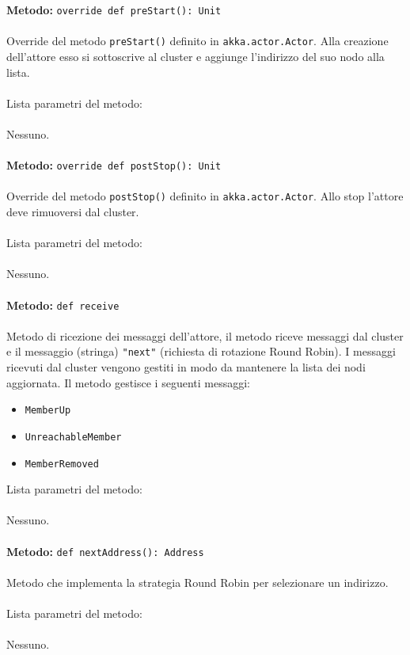 \documentclass[a4paper]{article}
\begin{document}
			\textbf{Metodo: }\texttt{override def preStart(): Unit}
			\\ \\
			Override del metodo \texttt{preStart()} definito in \texttt{akka.actor.Actor}. Alla creazione dell'attore esso si sottoscrive al cluster e aggiunge l'indirizzo del suo nodo alla lista.
			\\ \\
			Lista parametri del metodo:
			\\ \\
			Nessuno.
			\\ \\
			\textbf{Metodo: }\texttt{override def postStop(): Unit}
			\\ \\
			Override del metodo \texttt{postStop()} definito in \texttt{akka.actor.Actor}. Allo stop l'attore deve rimuoversi dal cluster.
			\\ \\
			Lista parametri del metodo:
			\\ \\
			Nessuno.
			\\ \\
			\textbf{Metodo: }\texttt{def receive}
			\\ \\
			Metodo di ricezione dei messaggi dell'attore, il metodo riceve messaggi dal cluster e il messaggio (stringa) \texttt{"next"} (richiesta di rotazione Round Robin). I messaggi ricevuti dal cluster vengono gestiti in modo da mantenere la lista dei nodi aggiornata. Il metodo gestisce i seguenti messaggi:
			\begin{itemize}
				\item \texttt{MemberUp}
				\item \texttt{UnreachableMember}
				\item \texttt{MemberRemoved}
			\end{itemize}
			Lista parametri del metodo:
			\\ \\
			Nessuno.
			\\ \\
		\textbf{Metodo: }\texttt{def nextAddress(): Address}
			\\ \\
			Metodo che implementa la strategia Round Robin per selezionare un indirizzo.
			\\ \\
			Lista parametri del metodo:
			\\ \\
			Nessuno.
			
\end{document}

